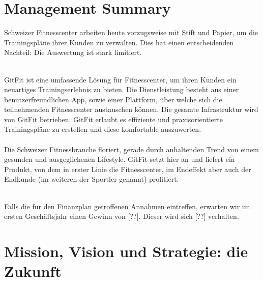 

\newcommand{\SUBJECT}{Businessplan}
\newcommand{\TITLE}{GitFit}





\clearpage

\section{Management Summary}

\pagestyle{headings}

Schweizer Fitnesscenter arbeiten heute vorzugsweise mit Stift und Papier, um die Trainingspläne ihrer Kunden zu verwalten. Dies hat einen entscheidenden Nachteil: Die Auswertung ist stark limitiert.

\hfill \\
GitFit ist eine umfassende Lösung für Fitnesscenter, um ihren Kunden ein neuartiges Trainingserlebnis zu bieten. Die Dienstleistung besteht aus einer benutzerfreundlichen App, sowie einer Plattform, über welche sich die teilnehmenden Fitnesscenter austauschen können. Die gesamte Infrastruktur wird von GitFit betrieben. GitFit erlaubt es effiziente und praxisorientierte Trainingspläne zu erstellen und diese komfortable auszuwerten.  
\hfill \\ \\
Die Schweizer Fitnessbranche floriert, gerade durch anhaltenden Trend von einem gesunden und ausgeglichenen Lifestyle. GitFit setzt hier an und liefert ein Produkt, von dem in erster Linie die Fitnesscenter, im Endeffekt aber auch der Endkunde (im weiteren der Sportler genannt) profitiert.  

\hfill \\
Falls die für den Finanzplan getroffenen Annahmen eintreffen, erwarten wir im ersten Geschäftsjahr einen Gewinn von [??]. Dieser wird sich [??] verhalten.




\clearpage
\section{Mission, Vision und Strategie: die Zukunft}
